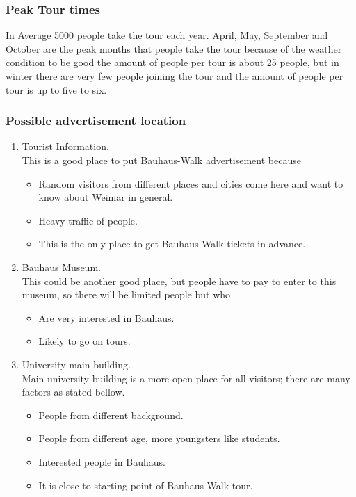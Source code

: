 \subsubsection{Peak Tour times}
In Average 5000 people take the tour each year. April, May, September and October are the peak months that people take the tour because of the weather condition to be good the amount of people per tour is about 25 people, but in winter there are very few people joining the tour and the amount of people per tour is up to five to six. 

\subsubsection{Possible advertisement location}

\begin {enumerate}

\item	Tourist Information. \\
This is a good place to put Bauhaus-Walk advertisement because 
\begin {itemize}
\item	Random visitors from different places and cities come here and want to know about Weimar in general. 
\item	Heavy traffic of people.
\item	This is the only place to get Bauhaus-Walk tickets in advance.
\end{itemize}


\item	Bauhaus Museum. \\
This could be another good place, but people have to pay to enter to this museum, so there will be limited people but who
\begin {itemize}
\item	Are very interested in Bauhaus.
\item	Likely to go on tours.
\end{itemize}


\item	University main building. \\
Main university building is a more open place for all visitors; there are many factors as stated bellow.

\begin {itemize}
\item	People from different background.	
\item	People from different age, more youngsters like students.
\item	Interested people in Bauhaus.
\item	It is close to starting point of Bauhaus-Walk tour.
\end{itemize}


\end{enumerate}


